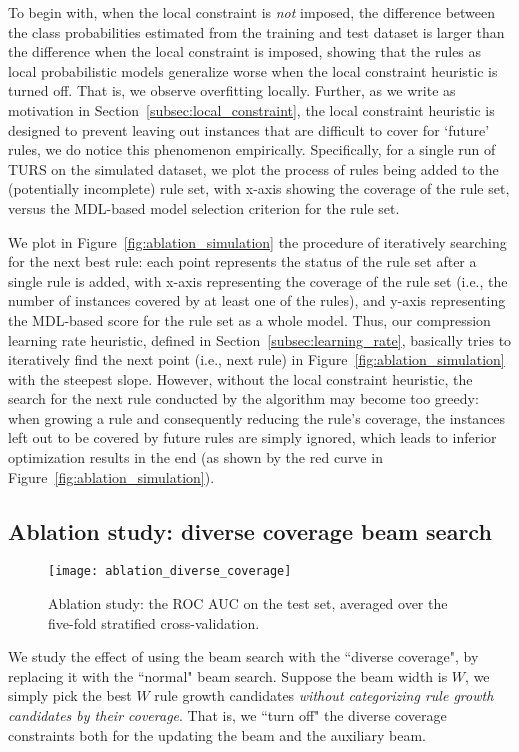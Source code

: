 To begin with, when the local constraint is \emph{not} imposed, the difference between the class probabilities estimated from the training and test dataset is larger than the difference when the local constraint is imposed, showing that the rules as local probabilistic models generalize worse when the local constraint heuristic is turned off. That is, we observe overfitting locally. Further, as we write as motivation in Section~\ref{subsec:local_constraint}, the local constraint heuristic is designed to prevent leaving out instances that are difficult to cover for `future' rules, we do notice this phenomenon empirically. Specifically, for a single run of TURS on the simulated dataset, we plot the process of rules being added to the (potentially incomplete) rule set, with x-axis showing the coverage of the rule set, versus the MDL-based model selection criterion for the rule set. 

We plot in Figure~\ref{fig:ablation_simulation} the procedure of iteratively searching for the next best rule: each point represents the status of the rule set after a single rule is added, with x-axis representing the coverage of the rule set (i.e., the number of instances covered by at least one of the rules), and y-axis representing the MDL-based score for the rule set as a whole model. Thus, our compression learning rate heuristic, defined in Section~\ref{subsec:learning_rate}, basically tries to iteratively find the next point (i.e., next rule) in Figure~\ref{fig:ablation_simulation} with the steepest slope. However, without the local constraint heuristic, the search for the next rule conducted by the algorithm may become too greedy: when growing a rule and consequently reducing the rule's coverage, the instances left out to be covered by future rules are simply ignored, which leads to inferior optimization results in the end (as shown by the red curve in Figure~\ref{fig:ablation_simulation}). 

\subsection{Ablation study: diverse coverage beam search}
\begin{figure}[ht] \label{fig:diverse_coverage}
	\texttt{[image: ablation\_diverse\_coverage]}
	\caption{Ablation study: the ROC AUC on the test set, averaged over the five-fold stratified cross-validation.}
	\label{fig:heatmap_modelcomplexity}
\end{figure}
We study the effect of using the beam search with the ``diverse coverage", by replacing it with the ``normal" beam search. Suppose the beam width is $W$, we simply pick the best $W$ rule growth candidates \emph{without categorizing rule growth candidates by their coverage}. That is, we ``turn off" the diverse coverage constraints both for the updating the beam and the auxiliary beam. 

